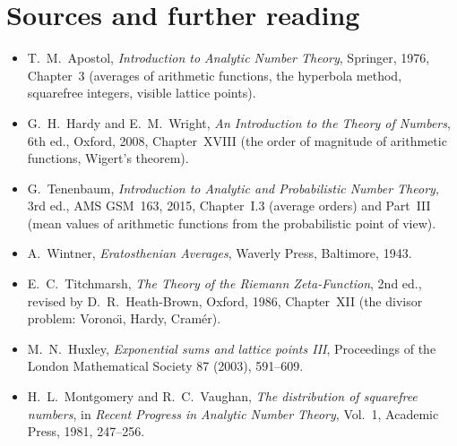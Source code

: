 \section*{Sources and further reading}

\begin{itemize}
\item T.~M.~Apostol, \emph{Introduction to Analytic Number Theory}, Springer, 1976, Chapter~3 (averages of arithmetic functions, the
hyperbola method, squarefree integers, visible lattice points).
\item G.~H.~Hardy and E.~M.~Wright, \emph{An Introduction to the Theory of Numbers}, 6th ed., Oxford, 2008, Chapter~XVIII (the order of
magnitude of arithmetic functions, Wigert's theorem).
\item G.~Tenenbaum, \emph{Introduction to Analytic and Probabilistic Number Theory}, 3rd ed., AMS GSM~163, 2015, Chapter~I.3 (average orders) and
Part~III (mean values of arithmetic functions from the probabilistic point of view).
\item A.~Wintner, \emph{Eratosthenian Averages}, Waverly Press, Baltimore, 1943.
\item E.~C.~Titchmarsh, \emph{The Theory of the Riemann Zeta-Function}, 2nd ed., revised by D.~R.~Heath-Brown, Oxford, 1986, Chapter~XII
(the divisor problem: Vorono\"\i, Hardy, Cram\'er).
\item M.~N.~Huxley, \emph{Exponential sums and lattice points III}, Proceedings of the London Mathematical Society 87 (2003), 591--609.
\item H.~L.~Montgomery and R.~C.~Vaughan, \emph{The distribution of squarefree numbers}, in \emph{Recent Progress in Analytic Number Theory},
Vol.~1, Academic Press, 1981, 247--256.
\end{itemize}
